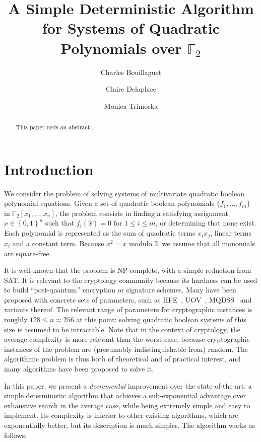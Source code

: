 \documentclass[a4paper,UKenglish,cleveref, autoref]{lipics-v2019}
\title{A Simple Deterministic Algorithm for Systems of Quadratic Polynomials over $\mathbb{F}_2$}
\author{Charles Bouillaguet}{LIP6 laboratory, Sorbonne Université, Paris, France}{charles.bouillaguet@lip6.fr}{https://orcid.org/0000-0001-9416-6244}{}
\author{Claire Delaplace}{MIS Laboratory, Université de Picardie Jules Verne, Amiens, France}{claire.delaplace@u-picardie.fr}{}{}
\author{Monica Trimoska}{MIS Laboratory, Université de Picardie Jules Verne, Amiens, France}{monica.trimoska@u-picardie.fr}{}{}
\newcommand{\bits}{\left\{0, 1\right\}}
\begin{document}
\maketitle

\begin{abstract}
  This paper neds an abstract...
\end{abstract}


\clearpage

\section{Introduction}

We consider the problem of solving systems of multivariate quadratic boolean
polynomial equations. Given a set of quadratic boolean polynomials
$\{f_1, \dots, f_m\}$ in $\mathbb{F}_2[x_1, \dots, x_n]$, the problem consists
in finding a satisfying assignment $\hat x \in \bits^n$ such that
$f_i(\hat x) = 0$ for $1 \leq i \leq m$, or determining that none exist. Each
polynomial is represented as the sum of quadratic terms $x_i x_j$, linear terms
$x_i$ and a constant term. Because $x^2 = x$ modulo 2, we assume that all
monomials are square-free.



It is well-known that the problem is NP-complete, with a simple reduction from
SAT. It is relevant to the cryptology community because its hardness can be used
to build ``post-quantum'' encryption or signature schemes. Many have been
proposed with concrete sets of parameters, such as HFE~\cite{Patarin96},
UOV~\cite{KipnisPG99}, MQDSS~\cite{ChenHRSS16} and variants thereof.  The
relevant range of parameters for cryptographic instances is roughly
$128 \leq n \approx 256$ at this point: solving quadratic boolean systems of
this size is assumed to be intractable. Note that in the context of cryptology,
the average complexity is more relevant than the worst case, because
cryptographic instances of the problem are (presumably indistinguishable from)
random. The algorithmic problem is thus both of theoretical and of practical
interest, and many algorithms have been proposed to solve it.

In this paper, we present a \emph{decremental} improvement over the
state-of-the-art: a simple deterministic algorithm that achieves a
sub-exponential advantage over exhaustive search in the average case, while
being extremely simple and easy to implement. Its complexity is inferior to
other existing algorithms, which are exponentially better, but its description
is much simpler. The algorithm works as follows:
\end{document}
